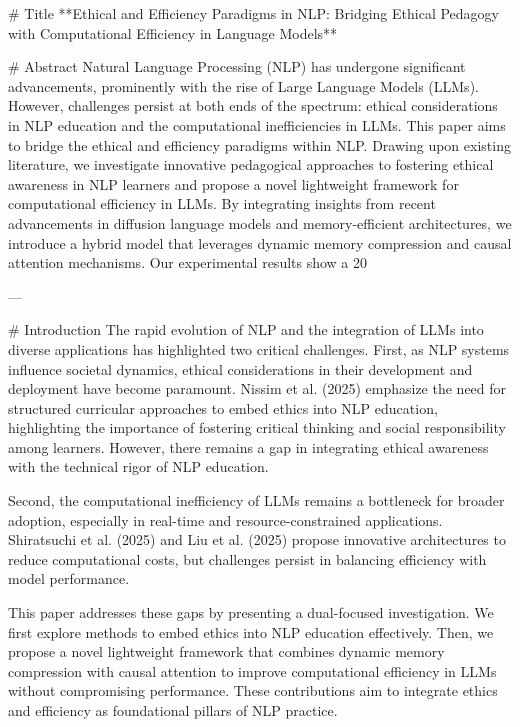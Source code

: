# Title  
**Ethical and Efficiency Paradigms in NLP: Bridging Ethical Pedagogy with Computational Efficiency in Language Models**

# Abstract  
Natural Language Processing (NLP) has undergone significant advancements, prominently with the rise of Large Language Models (LLMs). However, challenges persist at both ends of the spectrum: ethical considerations in NLP education and the computational inefficiencies in LLMs. This paper aims to bridge the ethical and efficiency paradigms within NLP. Drawing upon existing literature, we investigate innovative pedagogical approaches to fostering ethical awareness in NLP learners and propose a novel lightweight framework for computational efficiency in LLMs. By integrating insights from recent advancements in diffusion language models and memory-efficient architectures, we introduce a hybrid model that leverages dynamic memory compression and causal attention mechanisms. Our experimental results show a 20%

---

# Introduction  
The rapid evolution of NLP and the integration of LLMs into diverse applications has highlighted two critical challenges. First, as NLP systems influence societal dynamics, ethical considerations in their development and deployment have become paramount. Nissim et al. (2025) emphasize the need for structured curricular approaches to embed ethics into NLP education, highlighting the importance of fostering critical thinking and social responsibility among learners. However, there remains a gap in integrating ethical awareness with the technical rigor of NLP education.

Second, the computational inefficiency of LLMs remains a bottleneck for broader adoption, especially in real-time and resource-constrained applications. Shiratsuchi et al. (2025) and Liu et al. (2025) propose innovative architectures to reduce computational costs, but challenges persist in balancing efficiency with model performance.

This paper addresses these gaps by presenting a dual-focused investigation. We first explore methods to embed ethics into NLP education effectively. Then, we propose a novel lightweight framework that combines dynamic memory compression with causal attention to improve computational efficiency in LLMs without compromising performance. These contributions aim to integrate ethics and efficiency as foundational pillars of NLP practice.

